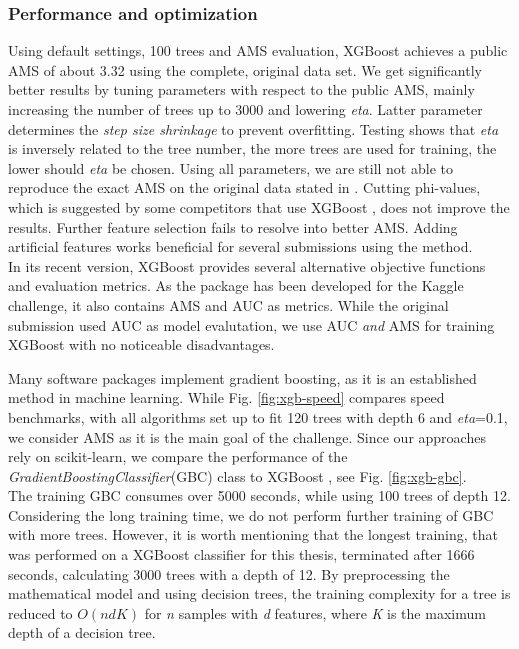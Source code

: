 \subsubsection{Performance and optimization}
Using default settings, 100 trees and AMS evaluation, XGBoost achieves a public AMS of about 3.32 using the complete, original data set. We get significantly better results by tuning parameters with respect to the public AMS, mainly increasing the number of trees up to 3000 and lowering \emph{eta}. Latter parameter determines the \emph{step size shrinkage} to prevent overfitting. Testing shows that \emph{eta} is inversely related to the tree number, the more trees are used for training, the lower should \emph{eta} be chosen.
Using all parameters, we are still not able to reproduce the exact AMS on the original data stated in \cite{chen14}.
Cutting phi-values, which is suggested by some competitors that use XGBoost \cite{blog}, does not improve the results. Further feature selection fails to resolve into better AMS. Adding artificial features works beneficial for several submissions using the method.\\
In its recent version, XGBoost provides several alternative objective functions and evaluation metrics. As the package has been developed for the Kaggle challenge, it also contains AMS and AUC as metrics. While the original submission used AUC as model evalutation, we use AUC \emph{and} AMS for training XGBoost with no noticeable disadvantages.

Many software packages implement gradient boosting, as it is an established method in machine learning. While Fig. \ref{fig:xgb-speed} compares speed benchmarks, with all algorithms set up to fit 120 trees with depth 6 and \emph{eta}=0.1, we consider AMS as it is the main goal of the challenge. Since our approaches rely on scikit-learn, we compare the performance of the \emph{GradientBoostingClassifier}(GBC) class to XGBoost , see Fig. \ref{fig:xgb-gbc}.\\
The training GBC consumes over 5000 seconds, while using 100 trees of depth 12. Considering the long training time, we do not perform further training of GBC with more trees. However, it is worth mentioning that the longest training, that was performed on a XGBoost classifier for this thesis, terminated after 1666 seconds, calculating 3000 trees with a depth of 12.
By preprocessing the mathematical model and using decision trees, the training complexity for a tree is reduced to $O(ndK)$ for \emph{n} samples with \emph{d} features, where \emph{K} is the maximum depth of a decision tree\cite{chen14}.

